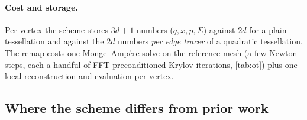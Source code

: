 \paragraph{Cost and storage.} Per vertex the scheme stores $3d+1$ numbers ($q,x,p,\Sigma$) against $2d$ for a
plain tessellation and against the $2d$ numbers \emph{per edge tracer} of a quadratic tessellation. The remap
costs one Monge--Amp\`ere solve on the reference mesh (a few Newton steps, each a handful of FFT-preconditioned
Krylov iterations, \cref{tab:ot}) plus one local reconstruction and evaluation per vertex.

\subsection{Where the scheme differs from prior work}\label{sec:prior}

